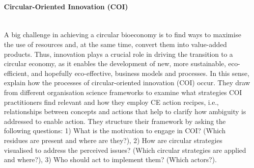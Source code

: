 \paragraph{Circular-Oriented Innovation (COI)} \mbox{}\\
A big challenge in achieving a circular bioeconomy is to find ways to maximise the use of resources and, at the same time, convert them into value-added products. Thus, innovation plays a crucial role in driving the transition to a circular economy, as it enables the development of new, more sustainable, eco-efficient, and hopefully eco-effective, business models and processes. In this sense, \cite{blomsma2022making} explain how the processes of circular-oriented innovation (COI) occur. They draw from different organisation science frameworks to examine what strategies COI practitioners find relevant and how they employ CE action recipes, i.e., relationships between concepts and actions that help to clarify how ambiguity is addressed to enable action. They structure their framework by asking the following questions: 1) What is the motivation to engage in COI? (Which residues are present and where are they?), 2) How are circular strategies visualised to address the perceived issues? (Which circular strategies are applied and where?), 3) Who should act to implement them? (Which actors?).

